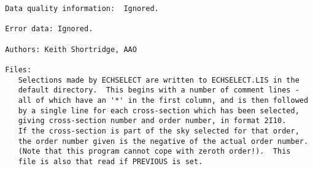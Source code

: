 \begin{description}
\begin{verbatim}
 Data quality information:  Ignored.

 Error data: Ignored.

 Authors: Keith Shortridge, AAO

 Files:
    Selections made by ECHSELECT are written to ECHSELECT.LIS in the
    default directory.  This begins with a number of comment lines -
    all of which have an '*' in the first column, and is then followed
    by a single line for each cross-section which has been selected,
    giving cross-section number and order number, in format 2I10.
    If the cross-section is part of the sky selected for that order,
    the order number given is the negative of the actual order number.
    (Note that this program cannot cope with zeroth order!).  This
    file is also that read if PREVIOUS is set.
\end{verbatim}
\end{description}
